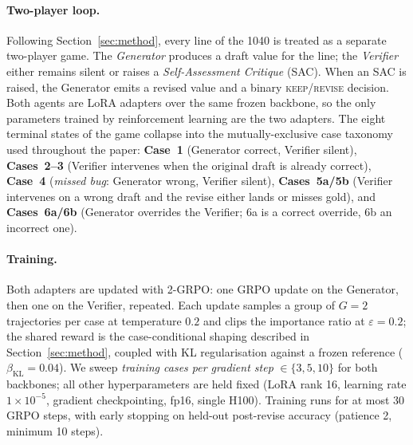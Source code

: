 \paragraph{Two-player loop.}
Following Section~\ref{sec:method}, every line of the 1040 is treated as
a separate two-player game. The \emph{Generator} produces a draft value
for the line; the \emph{Verifier} either remains silent or raises a
\emph{Self-Assessment Critique} (SAC). When an SAC is raised, the
Generator emits a revised value and a binary \textsc{keep}/\textsc{revise}
decision. Both agents are LoRA adapters over the same frozen backbone, so
the only parameters trained by reinforcement learning are the two
adapters. The eight terminal states of the game collapse into the
mutually-exclusive case taxonomy used throughout the paper:
\textbf{Case~1} (Generator correct, Verifier silent),
\textbf{Cases~2--3} (Verifier intervenes when the original draft is
already correct),
\textbf{Case~4} (\emph{missed bug}: Generator wrong, Verifier silent),
\textbf{Cases~5a/5b} (Verifier intervenes on a wrong draft and the
revise either lands or misses gold),
and \textbf{Cases~6a/6b} (Generator overrides the Verifier; 6a is a
correct override, 6b an incorrect one).

\paragraph{Training.}
Both adapters are updated with 2-GRPO: one GRPO update on the Generator,
then one on the Verifier, repeated. Each update samples a group of
$G{=}2$ trajectories per case at temperature $0.2$ and clips the
importance ratio at $\varepsilon{=}0.2$; the shared reward is the
case-conditional shaping described in Section~\ref{sec:method}, coupled
with KL regularisation against a frozen reference
($\beta_{\text{KL}}{=}0.04$). We sweep \emph{training cases per
gradient step} $\in\{3, 5, 10\}$ for both backbones; all other
hyperparameters are held fixed (LoRA rank 16, learning rate
$1{\times}10^{-5}$, gradient checkpointing, fp16, single H100). Training
runs for at most 30 GRPO steps, with early stopping on held-out
post-revise accuracy (patience 2, minimum 10 steps).

